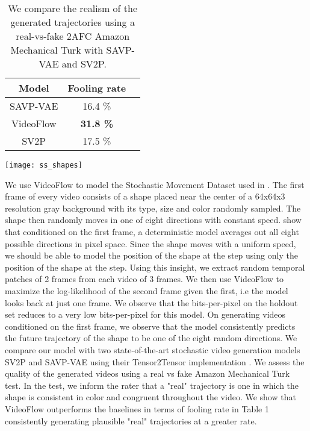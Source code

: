 \documentclass{article} \usepackage{iclr2020_conference,times}
\begin{document}
\begin{table}
	\begin{minipage}{0.5\linewidth}
		\centering
		\begin{tabular}{c c c}
		    \hline
			Model & Fooling rate \\
			\hline\hline
			SAVP-VAE & 16.4 \% \\
			VideoFlow & \textbf{31.8 \%} \\
			SV2P & 17.5 \% \\
			\hline
		\end{tabular}
		\caption{We compare the realism of the generated trajectories using a real-vs-fake 2AFC Amazon Mechanical Turk with SAVP-VAE and SV2P.}
	\end{minipage}\hfill
	\begin{minipage}{0.45\linewidth}
		\centering
		\texttt{[image: ss\_shapes]}
	\end{minipage}
\label{tab:ss_shapes}
\end{table}

We use VideoFlow to model the Stochastic Movement Dataset used in \citep{babaeizadeh2017stochastic}. The first frame of every video consists of a shape placed near the center of a 64x64x3 resolution gray background with its type, size and color randomly sampled. The shape then randomly moves in one of eight directions with constant speed. \citep{babaeizadeh2017stochastic} show that conditioned on the first frame, a deterministic model averages out all eight possible directions in pixel space. Since the shape moves with a uniform speed, we should be able to model the position of the shape at the  step using only the position of the shape at the  step. Using this insight, we extract random temporal patches of 2 frames from each video of 3 frames. We then use VideoFlow to maximize the log-likelihood of the second frame given the first, i.e the model looks back at just one frame. We observe that the bits-per-pixel on the holdout set reduces to a very low  bits-per-pixel for this model. On generating videos conditioned on the first frame, we observe that the model consistently predicts the future trajectory of the shape to be one of the eight random directions. We compare our model with two state-of-the-art stochastic video generation models SV2P and SAVP-VAE \citep{babaeizadeh2017stochastic,lee2018stochastic} using their Tensor2Tensor implementation \citep{vaswani2018tensor2tensor}. We
assess the quality of the generated videos using a real vs fake Amazon Mechanical Turk test. In the test, we inform the rater that a "real" trajectory is one in which the shape is consistent in color and congruent throughout the video. We show that VideoFlow outperforms the baselines in terms of fooling rate in Table 1 consistently generating plausible "real" trajectories at a greater rate.
\end{document}
